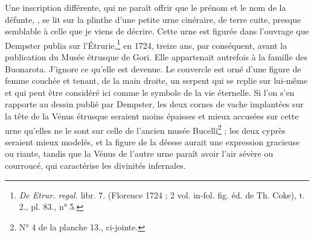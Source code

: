 \documentclass{article}
\newcommand*\svgAAF{}
\begin{document}
Une inscription différente, qui ne paraît offrir que le prénom et le nom de la défunte, $\svgAAF$, se lit sur la plinthe d'une petite urne cinéraire, de terre cuite, presque semblable à celle que je viens de décrire. Cette urne est figurée dans l'ouvrage que Dempster publia sur l'Étrurie,\footnote{\emph{De Etrur. regal.} libr. 7. (Florence 1724 ; 2 vol. in-fol. fig. éd. de Th. Coke), t. 2., pl. 83., n° 5.} en 1724, treize ans, par conséquent, avant la publication du Musée étrusque de Gori. Elle appartenait autrefois à la famille des Buonarota. J'ignore ce qu'elle est devenue. Le couvercle est orné d'une figure de femme couchée et tenant, de la main droite, un serpent qui se replie sur lui-même et qui peut être considéré ici comme le symbole de la vie éternelle. Si l'on s'en rapporte au dessin publié par Dempster, les deux cornes de vache implantées sur la tête de la Vénus étrusque seraient moins épaisses et mieux accusées sur cette urne qu'elles ne le sont sur celle de l'ancien musée Bucelli\footnote{N° 4 de la planche 13., ci-jointe.} ; les deux cyprès seraient mieux modelés, et la figure de la déesse aurait une expression gracieuse ou riante, tandis que la Vénus de l'autre urne paraît avoir l'air sévère ou courroucé, qui caractérise les divinités infernales.
\end{document}
